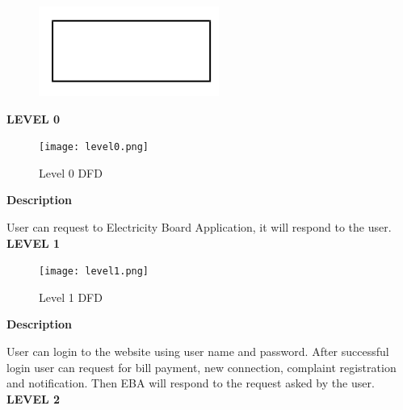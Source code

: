 \documentclass[12pt,a4paper,oneside]{report}
\begin{document}
 \begin{figure}[h]
   	\begin{center}
   	
   	
   		\includegraphics[width=3 in,height=1 in]{ex.png}
   			\end{center}
   \end{figure}

\textbf{LEVEL 0}

\begin{figure}[h]
  	\begin{center}
  		\texttt{[image: level0.png]}
  			\caption{Level 0 DFD}
  			\label{Level 0 DFD}
  	\end{center}
  \end{figure}
  \textbf{Description}
  \\
  \par User can request to Electricity Board Application, it will respond to the user.\\
  \newpage
  \textbf{LEVEL 1}
  
  \begin{figure}[h]
    	\begin{center}
    		\texttt{[image: level1.png]}
    			\caption{Level 1 DFD}
    			\label{Level 1 DFD}
    	\end{center}
    \end{figure}
    
    \textbf{Description}
    \\
    \par User can login to the website using user name and password. After successful login user
    can request for bill payment, new connection, complaint registration and notification. Then
    EBA will respond to the request asked by the user.\\
  \newpage  
    \textbf{LEVEL 2}
      
\end{document}
